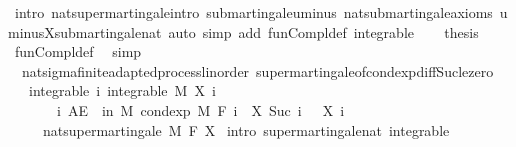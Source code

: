 \begin{isabellebody}
\ {\isacharparenleft}{\kern0pt}intro\ nat{\isacharunderscore}{\kern0pt}supermartingale{\isachardot}{\kern0pt}intro\ submartingale{\isachardot}{\kern0pt}uminus\ nat{\isacharunderscore}{\kern0pt}submartingale{\isachardot}{\kern0pt}axioms\ uminus{\isacharunderscore}{\kern0pt}X{\isachardot}{\kern0pt}submartingale{\isacharunderscore}{\kern0pt}nat{\isacharparenright}{\kern0pt}\ {\isacharparenleft}{\kern0pt}auto\ simp\ add{\isacharcolon}{\kern0pt}\ fun{\isacharunderscore}{\kern0pt}Compl{\isacharunderscore}{\kern0pt}def\ integrable{\isacharparenright}{\kern0pt}\isanewline
\ \ \isamarkupfalse%
\ {\isacharquery}{\kern0pt}thesis\ \isamarkupfalse%
\ fun{\isacharunderscore}{\kern0pt}Compl{\isacharunderscore}{\kern0pt}def\ \isamarkupfalse%
\ simp\isanewline
{}\isamarkupfalse%
%
\endisatagproof
{\isafoldproof}%
%
\isadelimproof
\isanewline
%
\endisadelimproof
\isanewline
{}\isamarkupfalse%
\ {\isacharparenleft}{\kern0pt}\ nat{\isacharunderscore}{\kern0pt}sigma{\isacharunderscore}{\kern0pt}finite{\isacharunderscore}{\kern0pt}adapted{\isacharunderscore}{\kern0pt}process{\isacharunderscore}{\kern0pt}linorder{\isacharparenright}{\kern0pt}\ supermartingale{\isacharunderscore}{\kern0pt}of{\isacharunderscore}{\kern0pt}cond{\isacharunderscore}{\kern0pt}exp{\isacharunderscore}{\kern0pt}diff{\isacharunderscore}{\kern0pt}Suc{\isacharunderscore}{\kern0pt}le{\isacharunderscore}{\kern0pt}zero{\isacharcolon}{\kern0pt}\isanewline
\ \ \ integrable{\isacharcolon}{\kern0pt}\ {\isachardoublequoteopen}{\isasymAnd}i{\isachardot}{\kern0pt}\ integrable\ M\ {\isacharparenleft}{\kern0pt}X\ i{\isacharparenright}{\kern0pt}{\isachardoublequoteclose}\ \isanewline
\ \ \ \ \ \ \ {\isachardoublequoteopen}{\isasymAnd}i{\isachardot}{\kern0pt}\ AE\ {\isasymxi}\ in\ M{\isachardot}{\kern0pt}\ cond{\isacharunderscore}{\kern0pt}exp\ M\ {\isacharparenleft}{\kern0pt}F\ i{\isacharparenright}{\kern0pt}\ {\isacharparenleft}{\kern0pt}{\isasymlambda}{\isasymxi}{\isachardot}{\kern0pt}\ X\ {\isacharparenleft}{\kern0pt}Suc\ i{\isacharparenright}{\kern0pt}\ {\isasymxi}\ {\isacharminus}{\kern0pt}\ X\ i\ {\isasymxi}{\isacharparenright}{\kern0pt}\ {\isasymxi}\ {\isasymle}\ {}{\isachardoublequoteclose}\ \isanewline
\ \ \ \ \ {\isachardoublequoteopen}nat{\isacharunderscore}{\kern0pt}supermartingale\ M\ F\ X{\isachardoublequoteclose}\isanewline
%
\isadelimproof
%
\endisadelimproof
%
\isatagproof
{}\isamarkupfalse%
\ {\isacharparenleft}{\kern0pt}intro\ supermartingale{\isacharunderscore}{\kern0pt}nat\ integrable{\isacharparenright}{\kern0pt}\ \isanewline

\end{isabellebody}
